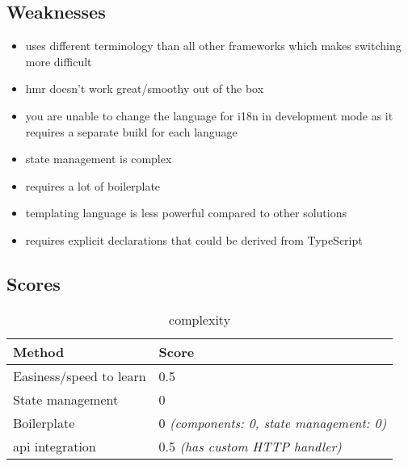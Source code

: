 \subsection{Weaknesses}
\label{subsec:angular:weaknesses}
\begin{itemize}
    \item uses different terminology than all other frameworks which makes switching more difficult
    \item \acrshort{hmr} doesn't work great/smoothy out of the box
    \item you are unable to change the language for \acrshort{i18n} in development mode as it requires a separate build for each language
    \item state management is complex
    \item requires a lot of boilerplate
    \item templating language is less powerful compared to other solutions
    \item requires explicit declarations that could be derived from TypeScript
\end{itemize}


\subsection{Scores}
\label{subsec:angular:scores}

\begin{table}[H]
    \centering
    \begin{tabular}{|l|l|}
        \hline
        \textbf{Method}            & \textbf{Score}                                  \\
        \hline
        Easiness/speed to learn    & 0.5                                             \\ \hline
        State management           & 0                                               \\ \hline
        Boilerplate                & 0 \textit{(components: 0, state management: 0)} \\ \hline
        \acrshort{api} integration & 0.5 \textit{(has custom HTTP handler)}          \\ \hline
    \end{tabular}
    \caption{complexity}
    \label{tab:angular:complexity}
\end{table}

